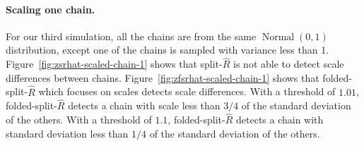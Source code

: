 \documentclass[american,]{article}
\let\oldparagraph\paragraph
\renewcommand{\paragraph}[1]{\oldparagraph{#1}\mbox{}}
\DeclareMathOperator{\N}{Normal}
\theoremstyle{definition}
\begin{document}
\hypertarget{scaling-one-chain}{%
\paragraph{Scaling one chain.}\label{scaling-one-chain}}
For our third simulation, all the chains are from the same $\N(0, 1)$ distribution,
except one of the chains is sampled with variance less than 1.
Figure~\ref{fig:zsrhat-scaled-chain-1} shows that
split-\(\widehat{R}\) is not able to detect scale differences between
chains.
%
Figure~\ref{fig:zfsrhat-scaled-chain-1} shows that
folded-split-\(\widehat{R}\) which focuses on scales detects scale
differences. With a threshold of \(1.01\),
folded-split-\(\widehat{R}\) detects a chain with scale less than
\(3/4\) of the standard deviation of the others. With a threshold of
\(1.1\), folded-split-\(\widehat{R}\) detects a chain with standard
deviation less than \(1/4\) of the standard deviation of the others.
\end{document}
